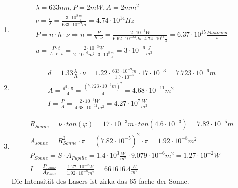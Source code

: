 \documentclass[12pt,a4paper,ngerman]{article}
\begin{document}
\begin{enumerate}
\item \begin{gather*}
\lambda = 633nm, P = 2mW, A = 2mm^2 \\
\nu = \frac{c}{\lambda} = \frac{3 \cdot 10^8\frac{m}{s}}{633 \cdot 10^{-9}m} = 4.74\cdot 10^{14}Hz \\
P = n \cdot h \cdot \nu \Rightarrow n = \frac{P}{h \cdot \nu} = \frac{2 \cdot 10^{-3}W}{6.62 \cdot 10^{-34} Js \cdot 4.74 \cdot 10^{14}\frac{1}{s}} = 6.37 \cdot 10^{15} \frac{Photonen}{s} \\
u = \frac{P \cdot t}{A \cdot c \cdot t} = \frac{2 \cdot 10^{-3}W}{2 \cdot 10^{-6}m^2 \cdot 3 \cdot 10^8 \frac{m}{s}} = 3 \cdot 10^{-6} \frac{J}{m^3}
\end{gather*}
\item \begin{gather*}
d = 1.33 \frac{\lambda}{R} \cdot \nu = 1.22 \cdot \frac{633 \cdot 10^{-9}m}{1.7 \cdot 10^{-3}}\cdot 17 \cdot 10^{-3} = 7.723 \cdot 10^{-6}m \\
A = \frac{d^2 \cdot \pi}{4} = \frac{(7.723 \cdot 10^{-6}m)^2}{4} = 4.68 \cdot 10^{-11} m^2 \\
I = \frac{P}{A} = \frac{2 \cdot 10^{-3}W}{4.68 \cdot 10^{-11}m^2} = 4.27 \cdot 10^7 \frac{W}{m^2}
\end{gather*}
\pagebreak
\item \begin{gather*}
R_{Sonne} = \nu \cdot tan(\varphi) = 17 \cdot 10^{-3}m \cdot tan(4.6 \cdot 10^{-3}) = 7.82 \cdot 10^{-5}m \\
A_{sonne} = R_{Sonne}^2\cdot \pi = (7.82 \cdot 10^{-5})^2 \cdot \pi = 1.92 \cdot 10^{-8}m^2 \\
P_{Sonne} = S \cdot A_{Pupille} = 1.4 \cdot 10^3 \frac{W}{m^2} \cdot 9.079 \cdot 10^{-6}m^2 = 1.27 \cdot 10^{-2}W \\
I = \frac{P_{Sonne}}{A_{Sonne}} = \frac{1.27 \cdot 10^{-2}W}{1.92 \cdot 10^{-8}m^2} = 661616.4 \frac{W}{m^2}
\end{gather*}
Die Intensität des Lasers ist zirka das 65-fache der Sonne. 
\end{enumerate}














 



   
\end{document}
